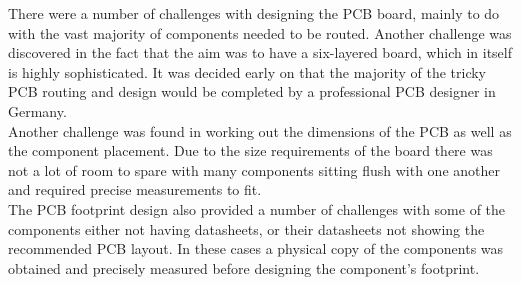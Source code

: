 	There were a number of challenges with designing the PCB board, mainly to do with the vast majority of components needed to be routed. 
Another challenge was discovered in the fact that the aim was to have a six-layered board, which in itself is highly sophisticated. 
It was decided early on that the majority of the tricky PCB routing and design would be completed by a professional PCB designer in Germany.\\
Another challenge was found in working out the dimensions of the PCB as well as the component placement. 
Due to the size requirements of the board there was not a lot of room to spare with many components sitting flush with one another and required precise measurements to fit. \\
The PCB footprint design also provided a number of challenges with some of the components either not having datasheets, or their datasheets not showing the recommended PCB layout. 
In these cases a physical copy of the components was obtained and precisely measured before designing the component's footprint.







